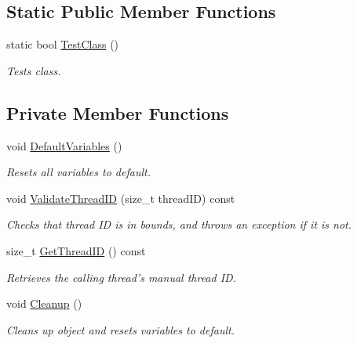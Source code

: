 \subsection*{Static Public Member Functions}
\begin{DoxyCompactItemize}
\item 
static bool \hyperlink{class_concurrency_control_ab3a9f4eb59ff8f5dfaecfec57d0f1d14}{TestClass} ()
\begin{DoxyCompactList}\small\item\em Tests class. \item\end{DoxyCompactList}\end{DoxyCompactItemize}
\subsection*{Private Member Functions}
\begin{DoxyCompactItemize}
\item 
\hypertarget{class_concurrency_control_a96de68ed0ed80870d50df60e68496af6}{
void \hyperlink{class_concurrency_control_a96de68ed0ed80870d50df60e68496af6}{DefaultVariables} ()}
\label{class_concurrency_control_a96de68ed0ed80870d50df60e68496af6}

\begin{DoxyCompactList}\small\item\em Resets all variables to default. \item\end{DoxyCompactList}\item 
void \hyperlink{class_concurrency_control_a7d7dc3ba467d27bfa118d1929b5a5d90}{ValidateThreadID} (size\_\-t threadID) const 
\begin{DoxyCompactList}\small\item\em Checks that thread ID is in bounds, and throws an exception if it is not. \item\end{DoxyCompactList}\item 
size\_\-t \hyperlink{class_concurrency_control_afd31026e93f3ea692eb93d638e1c643b}{GetThreadID} () const 
\begin{DoxyCompactList}\small\item\em Retrieves the calling thread's manual thread ID. \item\end{DoxyCompactList}\item 
void \hyperlink{class_concurrency_control_a03501e21a7e927dba93ed19895b407de}{Cleanup} ()
\begin{DoxyCompactList}\small\item\em Cleans up object and resets variables to default. \item\end{DoxyCompactList}\end{DoxyCompactItemize}
